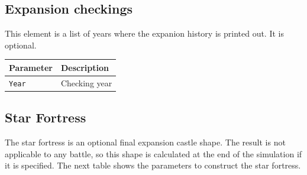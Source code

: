 \documentclass[tog]{acmsiggraph}
\begin{document}
\subsection{Expansion checkings}
\label{sec:expansioncheckings}

This element is a list of years where the expanion history is printed out. It is optional.

\begin{tabularx}{0.48\textwidth}{ |l|X| }
\hline 
\textbf{Parameter} & \textbf{Description} \\[0.15cm]
 \hline
 \texttt{Year} & Checking year \\
 \hline
\end{tabularx} 



\subsection{Star Fortress}
\label{sec:starfortress}

The star fortress is an optional final expansion castle shape.
The result is not applicable to any battle, so this shape is calculated at the end of the simulation if it is specified.
The next table shows the parameters to construct the star fortress. 
\end{document}
